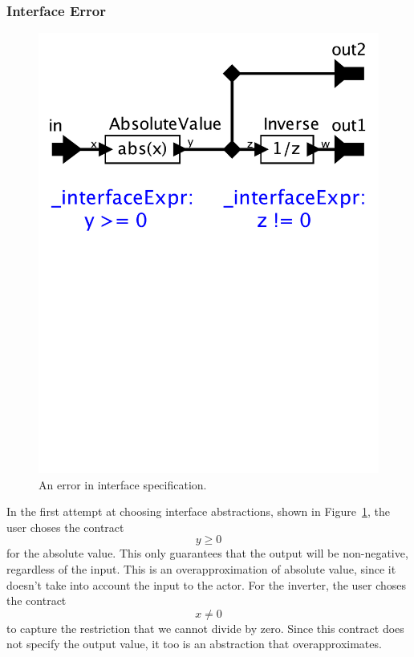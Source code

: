 \documentclass[preprint,11pt]{sigplanconf}
\begin{document}
\subsubsection{Interface Error}
\begin{figure}[htbp]
\centering
\includegraphics[width=\columnwidth]{figs/absoluteError}
\caption{An error in interface specification.}
\label{fig:absoluteError}
\end{figure}

In the first attempt at choosing interface abstractions, shown in
Figure~\ref{fig:absoluteError}, the user choses the contract
\[
y \ge 0
\]
for the absolute value.  This only guarantees that the output will be
non-negative, regardless of the input. This is an overapproximation of
absolute value, since it doesn't take into account the input to the actor.
%
For the inverter, the user choses the contract
\[
x \ne 0
\]
to capture the restriction that we cannot divide by zero.
Since this contract does not specify the output value, it too is an abstraction
that overapproximates.
\end{document}
